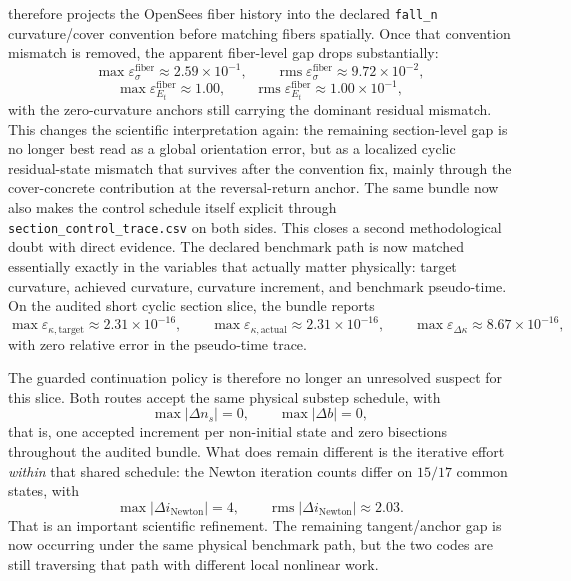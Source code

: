 therefore projects the OpenSees fiber history into the declared
\texttt{fall\_n} curvature/cover convention before matching fibers spatially.
Once that convention mismatch is removed, the apparent fiber-level gap drops
substantially:
\[
\max \varepsilon_{\sigma}^{\mathrm{fiber}} \approx 2.59\times10^{-1},\qquad
\operatorname{rms}\varepsilon_{\sigma}^{\mathrm{fiber}} \approx 9.72\times10^{-2},
\]
\[
\max \varepsilon_{E_t}^{\mathrm{fiber}} \approx 1.00,\qquad
\operatorname{rms}\varepsilon_{E_t}^{\mathrm{fiber}} \approx 1.00\times10^{-1},
\]
with the zero-curvature anchors still carrying the dominant residual mismatch.
This changes the scientific interpretation again: the remaining section-level
gap is no longer best read as a global orientation error, but as a localized
cyclic residual-state mismatch that survives after the convention fix, mainly
through the cover-concrete contribution at the reversal-return anchor.
The same bundle now also makes the control schedule itself explicit through
\texttt{section\_control\_trace.csv} on both sides.  This closes a second
methodological doubt with direct evidence.  The declared benchmark path is now
matched essentially exactly in the variables that actually matter physically:
target curvature, achieved curvature, curvature increment, and benchmark
pseudo-time.  On the audited short cyclic section slice, the bundle reports
\[
\max \varepsilon_{\kappa,\mathrm{target}}
\approx 2.31\times10^{-16},\qquad
\max \varepsilon_{\kappa,\mathrm{actual}}
\approx 2.31\times10^{-16},\qquad
\max \varepsilon_{\Delta\kappa}
\approx 8.67\times10^{-16},
\]
with zero relative error in the pseudo-time trace.

The guarded continuation policy is therefore no longer an unresolved suspect
for this slice.  Both routes accept the same physical substep schedule, with
\[
\max |\Delta n_s| = 0,\qquad
\max |\Delta b| = 0,
\]
that is, one accepted increment per non-initial state and zero bisections
throughout the audited bundle.  What does remain different is the iterative
effort \emph{within} that shared schedule: the Newton iteration counts differ
on \(15/17\) common states, with
\[
\max |\Delta i_{\mathrm{Newton}}| = 4,\qquad
\operatorname{rms}|\Delta i_{\mathrm{Newton}}| \approx 2.03.
\]
That is an important scientific refinement.  The remaining tangent/anchor gap
is now occurring under the same physical benchmark path, but the two codes are
still traversing that path with different local nonlinear work.

